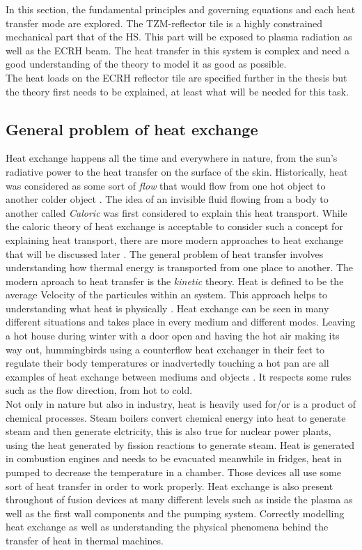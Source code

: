 \normalsize{In this section, the fundamental principles and governing equations and each heat transfer mode are explored. The TZM-reflector tile is a highly constrained mechanical part that of the \acrshort{HS}. This part will be exposed to plasma radiation as well as the \acrshort{ECRH} beam. The heat transfer in this system is complex and need a good understanding of the theory to model it as good as possible.}
\\
\normalsize{\indent The heat loads on the \acrshort{ECRH} reflector tile are specified further in the thesis but the theory first needs to be explained, at least what will be needed for this task.}
\\
\subsection{General problem of heat exchange}
\normalsize{Heat exchange happens all the time and everywhere in nature, from the sun's radiative power to the heat transfer on the surface of the skin. Historically, heat was considered as some sort of {\it flow} that would flow from one hot object to another colder object \cites{ahtt6e}. The idea of an invisible fluid flowing from a body to another called {\it Caloric} was first considered to explain this heat transport. While the caloric theory of heat exchange is acceptable to consider such a concept for explaining heat transport, there are more modern approaches to heat exchange that will be discussed later \cites{ahtt6e}. The general problem of heat transfer involves understanding how thermal energy is transported from one place to another. The modern aproach to heat transfer is the {\it kinetic} theory. Heat is defined to be the average Velocity of the particules within an system. This approach helps to understanding what heat is physically \cites{cengel2004heat}. Heat exchange can be seen in many different situations and takes place in every medium and different modes. Leaving a hot house during winter with a door open and having the hot air making its way out, hummingbirds using a counterflow heat exchanger in their feet to regulate their body temperatures \cites{UDVARDY_1983} or inadvertedly touching a hot pan are all examples of heat exchange between mediums and objects \cites{ahtt6e}. It respects some rules such as the flow direction, from hot to cold.}
\\
\break
\normalsize{\indent Not only in nature but also in industry, heat is heavily used for/or is a product of chemical processes. Steam boilers convert chemical energy into heat to generate steam and then generate elctricity, this is also true for nuclear power plants, using the heat generated by fission reactions to generate steam. Heat is generated in combustion engines and needs to be evacuated meanwhile in fridges, heat in pumped to decrease the temperature in a chamber. Those devices all use some sort of heat transfer in order to work properly. Heat exchange is also present throughout of fusion devices at many different levels such as inside the plasma as well as the first wall components and the pumping system. Correctly modelling heat exchange as well as understanding the physical phenomena behind the transfer of heat in thermal machines.}
